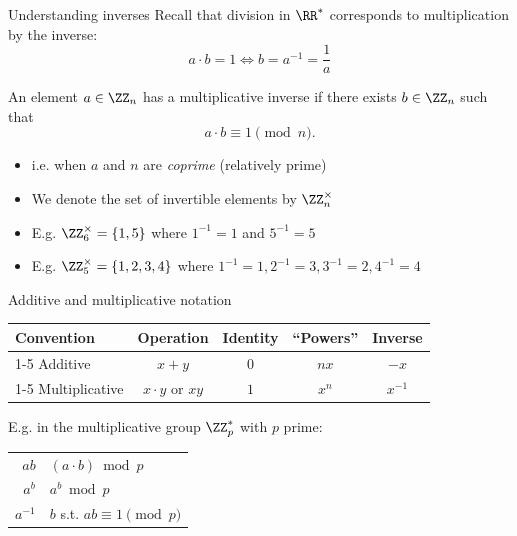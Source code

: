 \begin{frame}{Understanding inverses}
  Recall that division in $\RR^*$ corresponds to multiplication by the inverse:
  \[
    a \cdot b = 1 \iff b = a^{-1} = \frac{1}{a}
  \]

  \pause
  An element $a\in\ZZ_n$ has a multiplicative inverse if there exists $b\in\ZZ_n$ such that
  \[
    a\cdot b \equiv 1 \pmod{n}.
  \]
  \vspace*{-2em}
  \begin{itemize}[<+(1)->]
    \item i.e. when $a$ and $n$ are \emph{coprime} (relatively prime)
    \item We denote the set of invertible elements by $\ZZ_n^\times$
    \item E.g. $\ZZ_6^\times = \{1, 5\}$ where $1^{-1} = 1$ and $5^{-1} = 5$
    \item E.g. $\ZZ_5^\times = \{1, 2, 3, 4\}$ where  $1^{-1}=1, 2^{-1}=3, 3^{-1}=2, 4^{-1}=4$
  \end{itemize}
\end{frame}

\begin{frame}{Additive and multiplicative notation}
  \begin{center}
  \begin{tabular}{@{}l c c c c@{}}
    \toprule
    Convention & Operation & Identity & \enquote{Powers} & Inverse\\
    \cmidrule{1-5}
    Additive & $x + y$ & $0$ & $nx$ & $-x$\\
    \cmidrule{1-5}
    Multiplicative & $x\cdot y$ or $xy$ & $1$ & $x^n$ & $x^{-1}$\\
    \bottomrule
  \end{tabular}
  \end{center}

  \pause
  E.g. in the multiplicative group $\ZZ_p^*$ with $p$ prime:

  \begin{tabular}{r l}
    \pause $ab$     & $(a \cdot b) \bmod{p}$\\
    \pause $a^b$    & $a^b \bmod{p}$\\
    \pause $a^{-1}$ & $b$ s.t. $ab \equiv 1 \pmod{p}$
  \end{tabular}
\end{frame}


